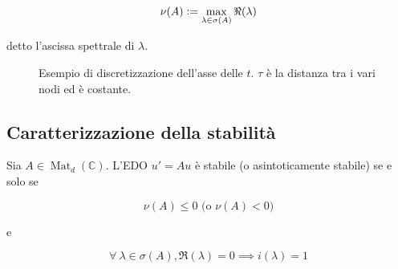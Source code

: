 \documentclass[hidelinks, 10pt]{report}
\DeclareMathOperator{\Mat}{Mat}
\begin{document}
\[ \nu(A) \vcentcolon= \max\limits_{\lambda \in \sigma(A)} \Re(\lambda) \]

detto l'ascissa spettrale di $ \lambda $. 

\begin{figure}[H]
\begin{center}

\caption{Esempio di discretizzazione dell'asse delle $ t $. $ \tau $ \`e la distanza tra i vari nodi ed \`e costante.}
\end{center}
\end{figure}

\subsection{Caratterizzazione della stabilit\`a}	\label{section:21.3}
Sia $ A \in \Mat_{d}(\mathbb{C}) $. L'EDO $ u' = A u $ \`e stabile (o asintoticamente stabile) se e solo se

\[ \nu(A) \le 0 \text{ (o } \nu(A) < 0) \]

e

\[ \forall\ \lambda \in \sigma(A), \Re(\lambda) = 0 \implies i(\lambda) = 1 \]
\end{document}
